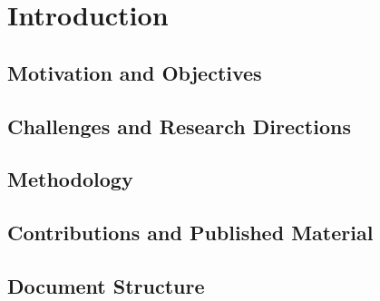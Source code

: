 \chapter{Introduction}

\section{Motivation and Objectives}


\section{Challenges and Research Directions}


\section{Methodology}


\section{Contributions and Published Material}


\section{Document Structure}
